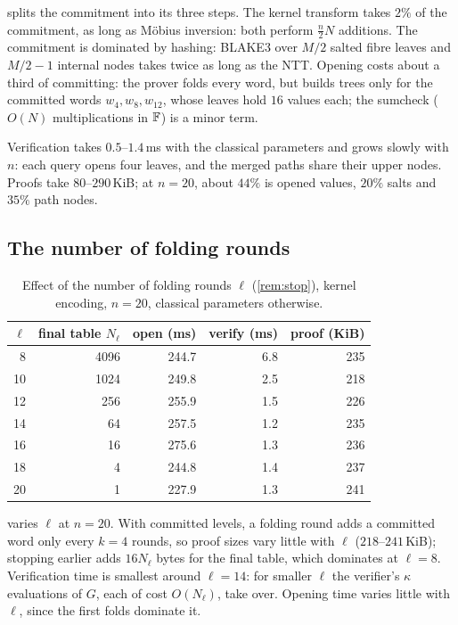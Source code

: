  splits the commitment into its three steps.
The kernel transform takes $2\%$ of the commitment, as long as M\"obius inversion: both perform $\tfrac{n}{2}N$ additions.
The commitment is dominated by hashing: BLAKE3 over $M/2$ salted fibre leaves and $M/2 - 1$ internal nodes takes twice as long as the NTT.
Opening costs about a third of committing: the prover folds every word, but builds trees only for the committed words $w_4, w_8, w_{12}$, whose leaves hold $16$ values each; the sumcheck ($O(N)$ multiplications in $\mathbb{F}$) is a minor term.

Verification takes $0.5$--$1.4$\,ms with the classical parameters and grows slowly with $n$: each query opens four leaves, and the merged paths share their upper nodes.
Proofs take $80$--$290$\,KiB; at $n = 20$, about $44\%$ is opened values, $20\%$ salts and $35\%$ path nodes.

\subsection{The number of folding rounds}\label{sec:exp:stop}

\begin{table}[t]
\centering
\small
\begin{tabular}{r r rrr}
\toprule
$\ell$ & final table $N_\ell$ & open (ms) & verify (ms) & proof (KiB) \\
\midrule
8 & 4096 & 244.7 & 6.8 & 235 \\
10 & 1024 & 249.8 & 2.5 & 218 \\
12 & 256 & 255.9 & 1.5 & 226 \\
14 & 64 & 257.5 & 1.2 & 235 \\
16 & 16 & 275.6 & 1.3 & 236 \\
18 & 4 & 244.8 & 1.4 & 237 \\
20 & 1 & 227.9 & 1.3 & 241 \\
\bottomrule
\end{tabular}
\caption{Effect of the number of folding rounds $\ell$ (\cref{rem:stop}), kernel encoding, $n = 20$, classical parameters otherwise.}
\label{tab:stop}
\end{table}

 varies $\ell$ at $n = 20$.
With committed levels, a folding round adds a committed word only every $k = 4$ rounds, so proof sizes vary little with $\ell$ ($218$--$241$\,KiB); stopping earlier adds $16 N_\ell$ bytes for the final table, which dominates at $\ell = 8$.
Verification time is smallest around $\ell = 14$: for smaller $\ell$ the verifier's $\kappa$ evaluations of $G$, each of cost $O(N_\ell)$, take over.
Opening time varies little with $\ell$, since the first folds dominate it.

